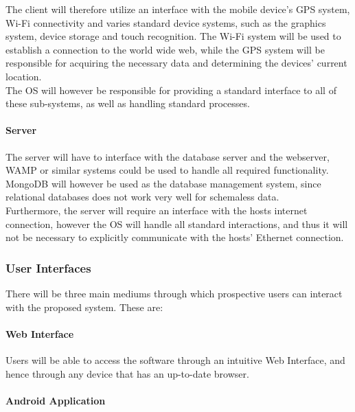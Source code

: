 \documentclass[12pt,a4paper]{article}
\begin{document}
					The client will therefore utilize an interface with the mobile device's GPS system, 
					Wi-Fi connectivity and varies standard device systems, such as the graphics system, 
					device storage and touch recognition. The Wi-Fi system will be used to establish a 
					connection to the world wide web, while the GPS system will be responsible for 
					acquiring the necessary data and determining the devices' current location.\\
					The OS will however be responsible for providing a standard interface to all of these 
					sub-systems, as well as handling standard processes.
			
				\paragraph{Server}
				
					The server will have to interface with the database server and the webserver, WAMP or 
					similar systems could be used to handle all required functionality. MongoDB will however 
					be used as the database management system, since relational databases does not work very 
					well for schemaless data. \\
					Furthermore, the server will require an interface with the hosts 
					internet connection, however the OS will handle all standard interactions, and thus it will
					not be necessary to explicitly communicate with the hosts' Ethernet connection.

			\subsubsection{User Interfaces}

				There will be three main mediums through which prospective users can
				interact with the proposed system. These are:

				\paragraph{Web Interface}

					Users will be able to access the software through an intuitive Web
					Interface, and hence through any device that has an up-to-date browser.

				\paragraph{Android Application}
\end{document}
